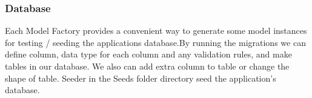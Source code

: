 \documentclass[letterpaper, 10 pt, conference]{ieeeconf}  %
\begin{document}
\begin{center}
\end{center}
\subsubsection{Database\\}
Each Model Factory provides a convenient way to generate some model instances for testing / seeding the applications database.By running the migrations we can define column, data type for each column and any validation rules, and make tables in our database. We also can add extra column to table or change the shape of table. Seeder in the Seeds folder directory seed the application's database.\\


\begin{center}
\end{center}
\end{document}
